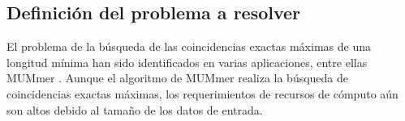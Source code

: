 \documentclass[12pt,a4paper]{article}
\providecommand{\e}[1]{\ensuremath{\times 10^{#1}}}
\begin{document}
\subsection{Definición del problema a resolver}
\indent
El problema de la búsqueda de las coincidencias exactas máximas de una longitud mínima han sido identificados en varias aplicaciones, entre ellas MUMmer \cite{Mummer3}. Aunque el algoritmo de MUMmer realiza la búsqueda de coincidencias exactas máximas, los requerimientos de recursos de cómputo aún son altos debido al tamaño de los datos de entrada.\\
\indent
\end{document}
